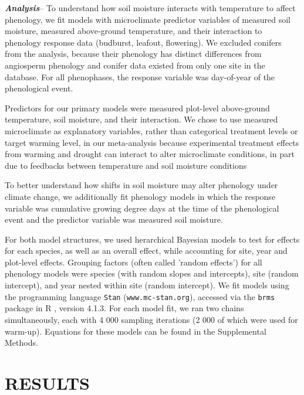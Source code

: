 \documentclass{article}
\begin{document}
\par\textbf {\emph{Analysis}}--
To understand how soil moisture interacts with temperature to affect phenology, we fit models with microclimate predictor variables of measured soil moisture, measured above-ground temperature, and their interaction to phenology response data (budburst, leafout, flowering). We excluded conifers from the analysis, because their phenology has distinct differences from angiosperm phenology \cite{polgar2014} and conifer data existed from only one site in the database. For all phenophases, the response variable was day-of-year of the phenological event. 
\par Predictors for our primary models were measured plot-level above-ground temperature, soil moisture, and their interaction. We chose to use measured microclimate as explanatory variables, rather than categorical treatment levels or target warming level, in our meta-analysis because experimental treatment effects from warming and drought can interact to alter microclimate conditions, in part due to feedbacks between temperature and soil moisture conditions \citep{ettinger2019,mcdaniel2014}

\par To better understand how shifts in soil moisture may alter phenology under climate change, we additionally fit phenology models in which the response variable was cumulative growing degree days at the time of the phenological event and the predictor variable was measured soil moisture. 

\par For both model structures, we used herarchical Bayesian models to test for effects for each species, as well as an overall effect, while accounting for site, year and plot-level effects. Grouping factors (often called 'random effects') for all phenology models were species (with random slopes and intercepts), site (random intercept), and year nested within site (random intercept). We fit models using the programming language \texttt{Stan} \citep{Carpenter:2016aa} (\texttt{www.mc-stan.org}), accessed via the \texttt{brms}\citep{burkner2021} package in R \citep{rcoreteam2022}, version 4.1.3. For each model fit, we ran two chains simultaneously, each with 4 000 sampling iterations (2 000 of which were used for warm-up). Equations for these models can be found in the Supplemental Methods. 

\section* {RESULTS}
\end{document}
